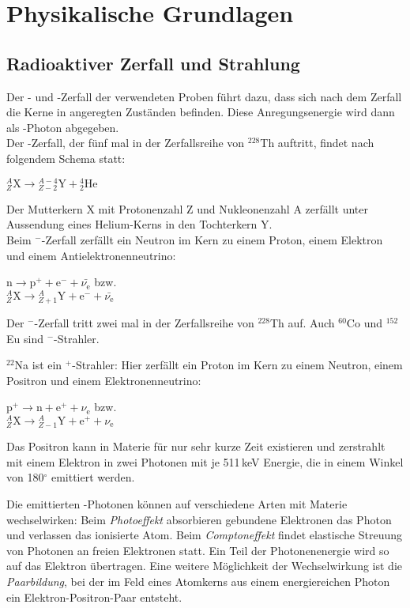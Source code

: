 \section{Physikalische Grundlagen}
\subsection{Radioaktiver Zerfall und Strahlung}

Der \textalpha- und \textbeta-Zerfall der verwendeten Proben führt dazu,
dass sich nach dem Zerfall die Kerne in angeregten Zuständen befinden.
Diese Anregungsenergie wird dann als \textgamma-Photon abgegeben.\\[\baselineskip]
Der \textalpha-Zerfall, der fünf mal in der Zerfallsreihe von ${}^{228}$Th auftritt,
findet nach folgendem Schema statt:
\begin{center}
${}^{A}_{Z}\text{X} \rightarrow {}^{A-4}_{Z-2}\text{Y} + {}^{4}_{2}\text{He}$
\end{center}
Der Mutterkern X mit Protonenzahl Z und Nukleonenzahl A zerfällt unter Aussendung eines Helium-Kerns
in den Tochterkern Y.\\[\baselineskip]
Beim \textbeta$^-$-Zerfall zerfällt ein Neutron im Kern zu einem Proton, einem Elektron und einem
Antielektronenneutrino:
\begin{center}
$\text{n} \rightarrow \text{p}^+ + \text{e}^- +\bar{\nu_{\text{e}}}$ bzw.\\[0.15cm]
${}^{A}_{Z}\text{X} \rightarrow {}^{A}_{Z+1}\text{Y} + \text{e}^- + \bar{\nu_{\text{e}}}$
\end{center}

Der \textbeta$^-$-Zerfall tritt zwei mal in der Zerfallsreihe von ${}^{228}$Th auf.
Auch ${}^{60}$Co und ${}^{152}$Eu sind \textbeta$^-$-Strahler.

${}^{22}$Na ist ein \textbeta$^+$-Strahler:
Hier zerfällt ein Proton im Kern zu einem Neutron, einem Positron und einem
Elektronenneutrino:
\begin{center}
$\text{p}^+ \rightarrow \text{n} + \text{e}^+ +\nu_{\text{e}}$ bzw.\\[0.15cm]
${}^{A}_{Z}\text{X} \rightarrow {}^{A}_{Z-1}\text{Y} + \text{e}^+ + \nu_{\text{e}}$
\end{center}

Das Positron kann in Materie für nur sehr kurze Zeit existieren und zerstrahlt mit einem Elektron
in zwei Photonen mit je 511\,keV Energie, die in einem Winkel von 180$^\circ$ emittiert werden.

Die emittierten \textgamma-Photonen können auf verschiedene Arten mit Materie wechselwirken:
Beim \emph{Photoeffekt} absorbieren gebundene Elektronen das Photon und verlassen das ionisierte Atom.
Beim \emph{Comptoneffekt} findet elastische Streuung von Photonen an freien Elektronen statt.
Ein Teil der Photonenenergie wird so auf das Elektron übertragen.
Eine weitere Möglichkeit der Wechselwirkung ist die \emph{Paarbildung}, bei der im Feld eines Atomkerns aus einem energiereichen
Photon ein Elektron-Positron-Paar entsteht.



